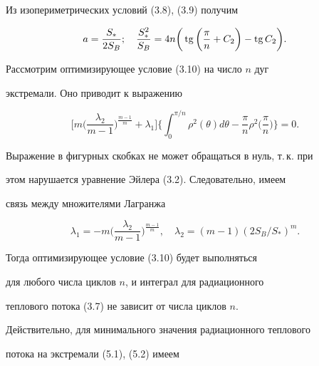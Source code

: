 Из изопериметрических условий (3.8), (3.9) получим


\begin{equation}


a = \frac {S_*}{2 S_B}; \quad


\frac {S^2_*}{S_B} = 4 n \bigg(\tg \bigg(


\frac {\pi}{n} + C_2\bigg) - \tg  C_2\bigg).


\end{equation}





Рассмотрим оптимизирующее условие (3.10) на число $n$ дуг


экстремали. Оно приводит к выражению


\begin{equation}


\bigg[ m \bigg( \frac {\lambda_2}{m-1} \bigg)^{\frac {m-1}{m}} +


\lambda_1 \bigg] 


\bigg\{ \int _0^{\pi/n} \rho^2 (\theta) d\theta -


\frac{\pi}{n} \rho^2 \bigg(\frac{\pi}{n}\bigg) \bigg\} = 0.


\end{equation}


Выражение в фигурных скобках не может обращаться в нуль, т.\,к. при


этом нарушается уравнение Эйлера (3.2). Следовательно, имеем


связь между множителями Лагранжа


\begin{equation}


\lambda_1 = - m \bigg( \frac {\lambda_2}{m-1} \bigg)^


{\frac {m-1}{m}}, \quad


\lambda_2 = (m-1) (2 S_B / S_*)^{m}.


\end{equation}


Тогда оптимизирующее условие (3.10) будет выполняться


для любого числа циклов $n$, и интеграл для радиационного


теплового потока (3.7) не зависит от числа циклов $n$.





Действительно, для минимального значения радиационного теплового


потока на экстремали (5.1), (5.2) имеем


